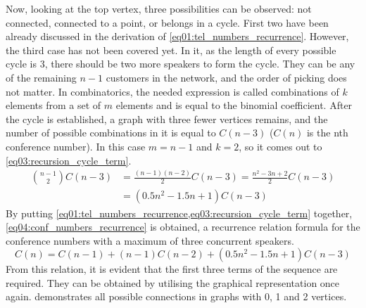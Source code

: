 \documentclass[stu, 11pt, a4paper, floatsintext]{apa7}
\begin{document}
	Now, looking at the top vertex, three possibilities can be observed: not connected, connected to a point, or belongs in a cycle. First two have been already discussed in the derivation of \cref{eq01:tel_numbers_recurrence}. However, the third case has not been covered yet. In it, as the length of every possible cycle is 3, there should be two more speakers to form the cycle. They can be any of the remaining $n-1$ customers in the network, and the order of picking does not matter. In combinatorics, the needed expression is called combinations of $k$ elements from a set of $m$ elements and is equal to the binomial coefficient. After the cycle is established, a graph with three fewer vertices remains, and the number of possible combinations in it is equal to $C(n-3)$ ($C(n)$ is the nth conference number). In this case $m=n-1$ and $k=2$, so it comes out to \cref{eq03:recursion_cycle_term}.
	\begin{equation}
		\label{eq03:recursion_cycle_term}
		\begin{split}
			\binom{n-1}{2}C(n-3) & =\frac{(n-1)(n-2)}{2}C(n-3)=\frac{n^2-3n+2}{2}C(n-3) \\
			& =(0.5n^2-1.5n+1)C(n-3)
		\end{split}
	\end{equation}
	By putting \cref{eq01:tel_numbers_recurrence,eq03:recursion_cycle_term} together, \cref{eq04:conf_numbers_recurrence} is obtained, a recurrence relation formula for the conference numbers with a maximum of three concurrent speakers.
	\begin{equation}
		\label{eq04:conf_numbers_recurrence}
		C(n)=C(n-1)+(n-1)C(n-2)+(0.5n^2-1.5n+1)C(n-3)
	\end{equation}
	From this relation, it is evident that the first three terms of the sequence are required. They can be obtained by utilising the graphical representation once again.  demonstrates all possible connections in graphs with 0, 1 and 2 vertices.
\end{document}
